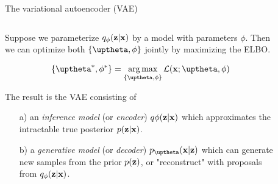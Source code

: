 \begin{frame}{The variational autoencoder (VAE)}
    \begin{columns}
        \begin{column}{0.8\textwidth}
        Suppose we parameterize $q_\phi({\mathbf{z}}|{\mathbf{x}})$ by a model with parameters $\phi$.
        Then we can optimize both $\{\thetab,\phi\}$ jointly by maximizing the ELBO.

        \begin{equation}
            \{\thetab^{*},\phi^{*}\} = \underset{\{\thetab, \phi\}}{\arg\max} \, \mathcal{L}(\xb;\thetab,\phi)
        \end{equation}
        
        The result is the VAE \cite{kingma_autoencoding_2014} consisting of
        \begin{itemize}
            \item[a)] an \textit{inference model} (or \textit{encoder}) $q\phi({\mathbf{z}}|{\mathbf{x}})$ which approximates the intractable true posterior $p({\mathbf{z}}|{\mathbf{x}})$.
            \item[b)] a \textit{generative model} (or \textit{decoder}) $p_\thetab(\xb|\zb)$ which can generate new samples from the prior $p({\mathbf{z}})$, or "reconstruct" with proposals from $q_\phi({\mathbf{z}}|{\mathbf{x}})$.
        \end{itemize}
        
        \end{column}

        \begin{column}{0.2\textwidth}
            \begin{figure}[.5\textwidth]
            \end{figure}
        
        \end{column}
    \end{columns}
\end{frame}


